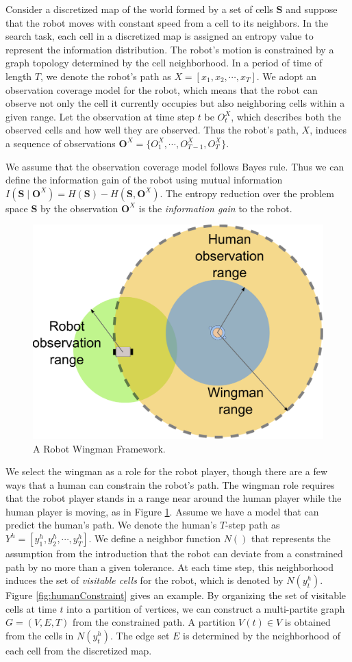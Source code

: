 \documentclass[phd]{byuprop}
\begin{document}
Consider a discretized map of the world formed by a set of cells $ \mathbf{S}$ and suppose that the robot moves with constant speed from a cell to its neighbors.
In the search task, each cell in a discretized map is assigned an entropy value to represent the information distribution.
The robot's motion is constrained by a graph topology determined by the cell neighborhood. 
In a period of time of length $ T $, we denote the robot's path as $ X = [x_{1}, x_{2} , \cdots , x_{T}] $.
We adopt an observation coverage model for the robot, which means that the robot can observe not only the cell it currently occupies but also neighboring cells within a given range.
Let the observation at time step $ t $ be $ O^{X}_{t} $, which describes both the observed cells and how well they are observed.
Thus the robot's path, $X$, induces a sequence of observations $ \mathbf{O}^{X} = \{ O^{X}_{1}, \cdots , O^{X}_{T-1}, O^{X}_{T} \}$.

We assume that the observation coverage model follows Bayes rule.
Thus we can define the information gain of the robot using mutual information $ I( \mathbf{S} \mid \mathbf{O}^{X} ) =  H( \mathbf{S} ) - H( \mathbf{S}, \mathbf{O}^{X}  ) $.
The entropy reduction over the problem space $ \mathbf{S} $ by the observation $ \mathbf{O}^{X} $ is the {\em information gain} to the robot.

\begin{figure}[hbtp]
\centering
\includegraphics[width=0.37\linewidth]{./fig/Wingman.pdf}
\caption{A Robot Wingman Framework.}
\label{fig:Wingman}
\end{figure}

We select the wingman as a role for the robot player, though there are a few ways that a human can constrain the robot's path.
The wingman role requires that the robot player stands in a range near around the human player while the human player is moving, as in Figure \ref{fig:Wingman}.
Assume we have a model that can predict the human's path.
We denote the human's $T$-step path as $ Y^{h} = [y^{h}_{1}, y^{h}_{2} , \cdots , y^{h}_{T}] $.
We define a neighbor function $ N () $ that represents the assumption from the introduction that the robot can deviate from a constrained path by no more than a given tolerance.  
At each time step, this neighborhood induces the set of {\em visitable cells} for the robot, which is denoted by $ N( y^{h}_{t} ) $.
Figure \ref{fig:humanConstraint} gives an example.
By organizing the set of visitable cells at time $ t $ into a partition of vertices, we can construct a multi-partite graph $ G = (V, E, T) $ from the constrained path.
A partition $ V(t) \in V $ is obtained from the cells in $ N( y^{h}_{t} ) $.
The edge set $ E $ is determined by the neighborhood of each cell from the discretized map.
\end{document}

